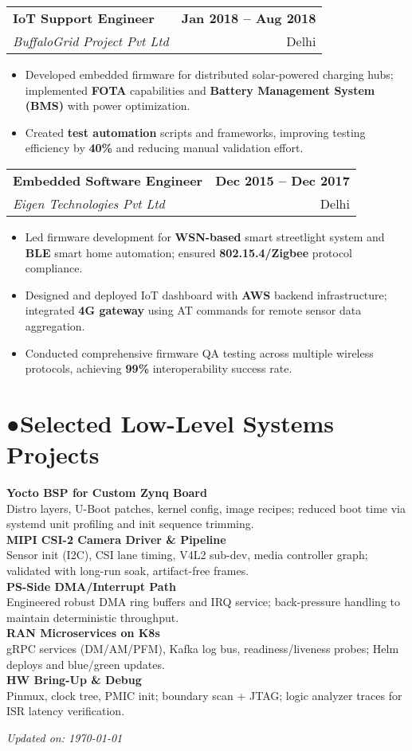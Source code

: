 \documentclass[11pt,a4paper]{article}
\makeatletter
\newcommand{\faCogs}{●}
\newcommand{\ressection}[2]{\section*{#2\hspace{0.5em}#1}}
\newcommand{\ressubsection}[4]{
    \vspace{6pt}
    {\renewcommand{\arraystretch}{1.1}
    \begin{tabular*}{\textwidth}{@{}l@{\extracolsep{\fill}}r@{}}
        {\large\textbf{#1}} & {\color{darkGrey}\textbf{#2}} \\
        {\color{accentcolor}\textit{#3}} & {\color{darkGrey}#4} \\
    \end{tabular*}}
    \vspace{3pt}
}
\newcommand{\projectitem}[1]{
    \textbf{\color{accentcolor}#1}\\[2pt]
}
\makeatother
\begin{document}
\ressubsection{IoT Support Engineer}{Jan 2018 -- Aug 2018}{BuffaloGrid Project Pvt Ltd}{Delhi}
{\color{textcolor}
\begin{itemize}[leftmargin=15pt,topsep=2pt,itemsep=2pt,parsep=0pt]
\item Developed embedded firmware for distributed solar-powered charging hubs; implemented \textbf{FOTA} capabilities and \textbf{Battery Management System (BMS)} with power optimization.
\item Created \textbf{test automation} scripts and frameworks, improving testing efficiency by \textbf{40\%} and reducing manual validation effort.
\end{itemize}
}

\ressubsection{Embedded Software Engineer}{Dec 2015 -- Dec 2017}{Eigen Technologies Pvt Ltd}{Delhi}
{\color{textcolor}
\begin{itemize}[leftmargin=15pt,topsep=2pt,itemsep=2pt,parsep=0pt]
\item Led firmware development for \textbf{WSN-based} smart streetlight system and \textbf{BLE} smart home automation; ensured \textbf{802.15.4/Zigbee} protocol compliance.
\item Designed and deployed IoT dashboard with \textbf{AWS} backend infrastructure; integrated \textbf{4G gateway} using AT commands for remote sensor data aggregation.
\item Conducted comprehensive firmware QA testing across multiple wireless protocols, achieving \textbf{99\%} interoperability success rate.
\end{itemize}
}

\ressection{Selected Low-Level Systems Projects}{\faCogs}
{\color{textcolor}
\projectitem{Yocto BSP for Custom Zynq Board} Distro layers, U-Boot patches, kernel config, image recipes; reduced boot time via systemd unit profiling and init sequence trimming.\\[4pt]

\projectitem{MIPI CSI-2 Camera Driver \& Pipeline} Sensor init (I2C), CSI lane timing, V4L2 sub-dev, media controller graph; validated with long-run soak, artifact-free frames.\\[4pt]

\projectitem{PS-Side DMA/Interrupt Path} Engineered robust DMA ring buffers and IRQ service; back-pressure handling to maintain deterministic throughput.\\[4pt]

\projectitem{RAN Microservices on K8s} gRPC services (DM/AM/PFM), Kafka log bus, readiness/liveness probes; Helm deploys and blue/green updates.\\[4pt]

\projectitem{HW Bring-Up \& Debug} Pinmux, clock tree, PMIC init; boundary scan + JTAG; logic analyzer traces for ISR latency verification.
}

\vspace{8pt}
\begin{center}
{\color{darkGrey}\textit{Updated on: \today}}
\end{center}
\end{document}

